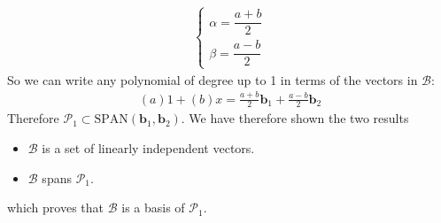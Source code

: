 {\begin{align*}
\begin{cases}
\alpha = \dfrac{a+b}{2} \\
\beta = \dfrac{a-b}{2} 
\end{cases}
\end{align*}
So we can write any polynomial of degree up to 1 in terms of the vectors in $\mathcal{B}$:
\begin{align*}
(a)1+(b)x = \frac{a+b}{2}\mathbf{b}_1 + \frac{a-b}{2}\mathbf{b}_2
\end{align*}
Therefore $ \mathcal{P}_1 \subset \text{SPAN}(\mathbf{b}_1,\mathbf{b}_2)$. We have therefore shown the two results
\begin{itemize}
\item $\mathcal{B}$ is a set of linearly independent vectors.
\item $\mathcal{B}$ spans $\mathcal{P}_1$.
\end{itemize}
which proves that $\mathcal{B}$ is a basis of $\mathcal{P}_1$.
}


